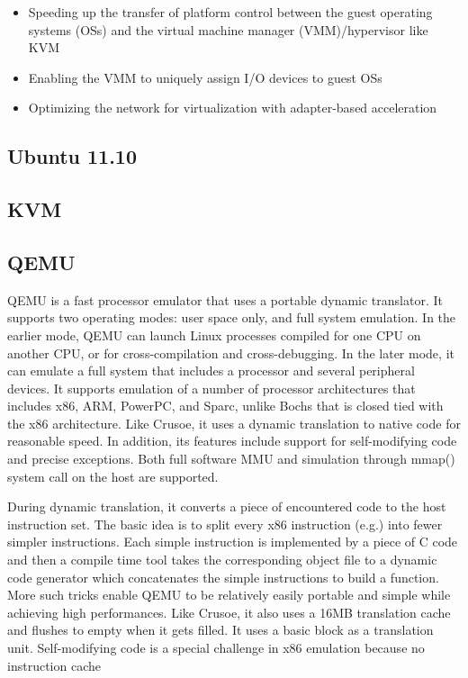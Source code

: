 \documentclass[12pt,a4paper]{report}
\begin{document}
\begin{itemize}
 \item Speeding up the transfer of platform control between the guest operating systems (OSs) and the virtual machine manager (VMM)/hypervisor like KVM
 \item Enabling the VMM to uniquely assign I/O devices to guest OSs
 \item Optimizing the network for virtualization with adapter-based acceleration
\end{itemize}





\subsection{Ubuntu 11.10}
\subsection{KVM}
\subsection{QEMU}

QEMU is a fast processor emulator that uses a portable dynamic translator. It supports two operating
modes: user space only, and full system emulation. In the earlier mode, QEMU can launch Linux processes
compiled for one CPU on another CPU, or for cross-compilation and cross-debugging. In the later mode, it
can emulate a full system that includes a processor and several peripheral devices. It supports emulation of a
number of processor architectures that includes x86, ARM, PowerPC, and Sparc, unlike Bochs that is closed
tied with the x86 architecture. Like Crusoe, it uses a dynamic translation to native code for reasonable speed.
In addition, its features include support for self-modifying code and precise exceptions. Both full software
MMU and simulation through mmap() system call on the host are supported. \cite{chiueh2005survey}

During dynamic translation, it converts a piece of encountered code to the host instruction set. The
basic idea is to split every x86 instruction (e.g.) into fewer simpler instructions. Each simple instruction
is implemented by a piece of C code and then a compile time tool takes the corresponding object ﬁle to a
dynamic code generator which concatenates the simple instructions to build a function. More such tricks
enable QEMU to be relatively easily portable and simple while achieving high performances. Like Crusoe,
it also uses a 16MB translation cache and ﬂushes to empty when it gets ﬁlled. It uses a basic block as a
translation unit. Self-modifying code is a special challenge in x86 emulation because no instruction cache
\end{document}
